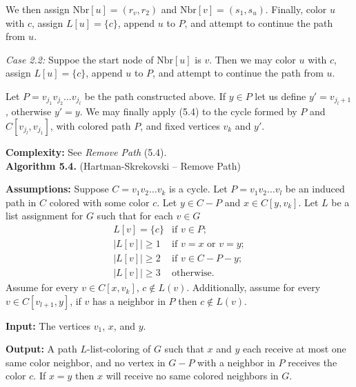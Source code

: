 \documentclass[letterpaper, 12pt]{article}
\theoremstyle{definition}
\theoremstyle{definition}
\theoremstyle{thm}
\theoremstyle{definition}
\begin{document}
We then assign $\text{Nbr}[u]=(r_v,r_2)$ and $\text{Nbr}[v]=(s_1,s_u)$. Finally,
color $u$ with $c$, assign $L[u]=\{c\}$, append $u$ to $P$, and attempt to
continue the path from $u$.

\textit{Case 2.2:} Suppoe the start node of $\text{Nbr}[u]$ is $v$. Then we may
color $u$ with $c$, assign $L[u]=\{c\}$, append $u$ to $P$, and attempt to
continue the path from $u$.

Let $P=v_{j_1}v_{j_2}\ldots v_{j_l}$ be the path constructed above.
If $y\in P$ let us define $y'=v_{j_l+1}$, otherwise $y'=y$.
We may finally apply  (5.4) to the cycle formed by $P$ and
$C[v_{j_l},v_{j_1}]$, with colored path $P$, and fixed
vertices $v_k$ and $y'$.

\noindent\textbf{Complexity:} See \textit{Remove Path} (5.4).\\

\noindent\textbf{Algorithm 5.4.} (Hartman-Skrekovski -- Remove Path)

\noindent\textbf{Assumptions:} Suppose $C=v_1v_2\ldots v_k$ is a cycle. Let
$P=v_1v_2\ldots v_l$ be an induced path in $C$ colored with some color $c$. Let
$y\in C-P$ and $x\in C[y,v_k]$. Let $L$ be a list assignment for $G$ such that
for each $v\in G$
\[
    \begin{array}{ll}
        L[v]=\{c\} & \text{if } v\in P;\\
	    |L[v]|\ge 1 & \text{if } v=x \text{ or } v=y;\\
	    |L[v]|\ge 2 & \text{if } v\in C-P-y;\\
	    |L[v]|\ge 3 & \text{otherwise.}
    \end{array}
\]
Assume for every $v\in C[x,v_k]$, $c\not\in L(v)$. Additionally, assume for
every $v\in C[v_{l+1},y]$, if $v$ has a neighbor in $P$ then $c\not\in L(v)$.

\noindent\textbf{Input:} The vertices $v_1$, $x$, and $y$.

\noindent\textbf{Output:} A path $L$-list-coloring of $G$ such that $x$ and
$y$ each receive at most one same color neighbor, and no vertex in
$G-P$ with a neighbor in $P$ receives the color $c$. If $x=y$ then $x$ will
receive no same colored neighbors in $G$.
\end{document}
